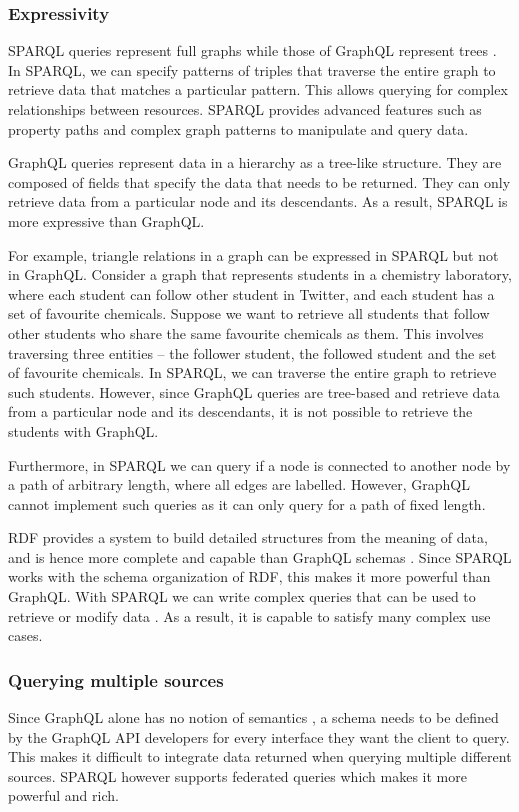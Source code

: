 \subsubsection*{Expressivity}
SPARQL queries represent full graphs while those of GraphQL represent trees \cite{Taelman2018}. In SPARQL, we can specify patterns of triples that traverse the entire graph to retrieve data that matches a particular pattern. This allows querying for complex relationships between resources. SPARQL provides advanced features such as property paths and complex graph patterns to manipulate and query data. 

GraphQL queries represent data in a hierarchy as a tree-like structure. They are composed of fields that specify the data that needs to be returned. They can only retrieve data from a particular node and its descendants. As a result, SPARQL is more expressive than GraphQL.

For example, triangle relations in a graph can be expressed in SPARQL but not in GraphQL. Consider a graph that represents students in a chemistry laboratory, where each student can follow other student in Twitter, and each student has a set of favourite chemicals. Suppose we want to retrieve all students that follow other students who share the same favourite chemicals as them. This involves traversing three entities – the follower student, the followed student and the set of favourite chemicals. In SPARQL, we can traverse the entire graph to retrieve such students. However, since GraphQL queries are tree-based and retrieve data from a particular node and its descendants, it is not possible to retrieve the students with GraphQL.

Furthermore, in SPARQL we can query if a node is connected to another node by a path of arbitrary length, where all edges are labelled. However, GraphQL cannot implement such queries as it can only query for a path of fixed length.

RDF provides a system to build detailed structures from the meaning of data, and is hence more complete and capable than GraphQL schemas \cite{Dresslar2019}. Since SPARQL works with the schema organization of RDF, this makes it more powerful than GraphQL. With SPARQL we can write complex queries that can be used to retrieve or modify data \cite{Angele2022}. As a result, it is capable to satisfy many complex use cases.

\subsubsection*{Querying multiple sources}
Since GraphQL alone has no notion of semantics \cite{Taelman2018}, a schema needs to be defined by the GraphQL API developers for every interface they want the client to query. This makes it difficult to integrate data returned when querying multiple different sources. SPARQL however supports federated queries which makes it more powerful and rich.
